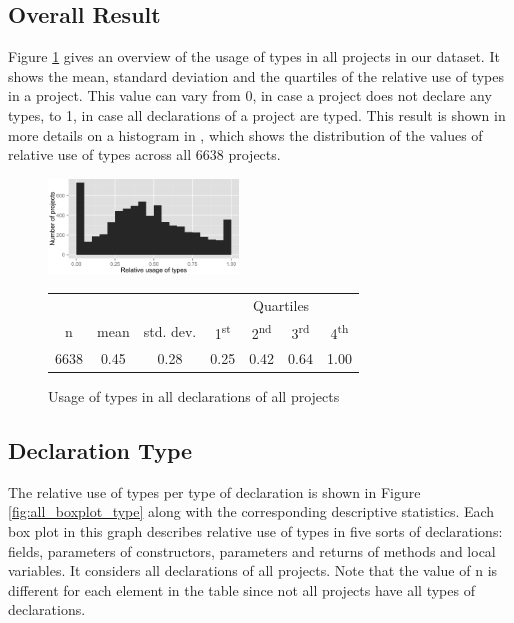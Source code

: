 \documentclass[preprint]{sigplanconf}
\newcommand{\ts}{\textsuperscript}
\begin{document}
\subsection{Overall Result\label{res-overall}}
Figure \ref{fig:all_histogram_all} gives an overview of the usage of types in all projects in our dataset.
It shows the mean, standard deviation and the quartiles of the relative use of types in a project. 
This value can vary from 0, in case a project does not declare any types, to 1, in case all declarations of a project are typed. 
This result is shown in more details on a histogram in , which shows the distribution of the values of relative use of types across all 6638 projects.


\begin{figure}[h]
\centering 
\includegraphics[width=0.45\textwidth]{../analysis/result/all/histograms/5_all_types.png} 

\vspace{0.3cm}
\small
\begin{tabular}{|c|c|c|cccc|}
\hline
{}		&  {}		&  {}			&  \multicolumn{4}{c|}{Quartiles}				\\
n		& mean	& std. dev.	& 1\ts{st}	& 2\ts{nd}	& 3\ts{rd}	& 4\ts{th}		\\
\hline
\hline
6638 	& 0.45	& 0.28		& 0.25	& 0.42		& 0.64	& 1.00		\\
\hline
\end{tabular}


\caption{Usage of types in all declarations of all projects}
\label{fig:all_histogram_all} 
\end{figure}



\subsection{Declaration Type\label{sub:res_all_type}}
The relative use of types per type of declaration is shown in Figure \ref{fig:all_boxplot_type} along with the corresponding descriptive statistics.
Each box plot in this graph describes relative use of types in five sorts of declarations: fields, parameters of constructors, parameters and returns of methods and local variables.
It considers all declarations of all projects.
Note that the value of n is different for each element in the table since not all projects have all types of declarations. 
\end{document}
